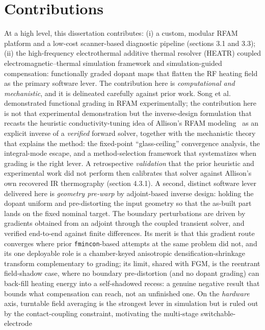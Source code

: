 \section{Contributions}
\label{sec:intro_contributions}

At a high level, this dissertation contributes: (i) a custom, modular RFAM
platform and a low-cost scanner-based diagnostic pipeline (sections 3.1 and 3.3);
(ii) the high-frequency electrothermal additive thermal resolver (HEATR) coupled electromagnetic--thermal simulation framework and
simulation-guided compensation: functionally graded dopant maps that flatten the
RF heating field as the primary software lever. The contribution here is
\emph{computational and mechanistic}, and it is delineated carefully against prior
work. Song et al.~\cite{Song2025RFAMUniformity} demonstrated functional grading in
RFAM experimentally; the contribution here is not that experimental demonstration
but the inverse-design formulation that recasts the heuristic conductivity-tuning
idea of Allison's RFAM modeling~\cite{allison2022computational} as an explicit
inverse of a \emph{verified} forward solver, together with the mechanistic theory that
explains the method: the fixed-point ``glass-ceiling'' convergence analysis, the
integral-mode escape, and a method-selection framework that systematizes when grading
is the right lever. A retrospective \emph{validation} that the prior heuristic and
experimental work did not perform then calibrates that solver against Allison's own recovered
IR thermography (section 4.3.1). A second, distinct software
lever delivered here is \emph{geometry pre-warp} by adjoint-based inverse design:
holding the dopant uniform and pre-distorting the input geometry so that the
as-built part lands on the fixed nominal target. The boundary perturbations are
driven by gradients obtained from an adjoint through the coupled transient solver,
and verified end-to-end against finite differences. Its merit is that this gradient
route converges where prior \texttt{fmincon}-based attempts at the same problem did
not, and its one deployable role is a chamber-keyed anisotropic
densification-shrinkage transform complementary to grading; its limit, shared with FGM, is
the reentrant field-shadow case, where no
boundary pre-distortion (and no dopant grading) can back-fill heating energy into a
self-shadowed recess: a genuine negative result that bounds what compensation can
reach, not an unfinished one. On the \emph{hardware} axis,
turntable field averaging is the strongest lever in simulation but is ruled out by
the contact-coupling constraint, motivating the multi-stage switchable-electrode
